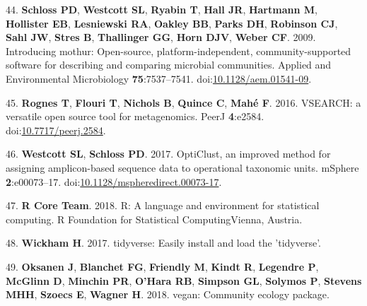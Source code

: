 \documentclass[11,]{article}
\begin{document}
44. \textbf{Schloss PD}, \textbf{Westcott SL}, \textbf{Ryabin T},
\textbf{Hall JR}, \textbf{Hartmann M}, \textbf{Hollister EB},
\textbf{Lesniewski RA}, \textbf{Oakley BB}, \textbf{Parks DH},
\textbf{Robinson CJ}, \textbf{Sahl JW}, \textbf{Stres B},
\textbf{Thallinger GG}, \textbf{Horn DJV}, \textbf{Weber CF}. 2009.
Introducing mothur: Open-source, platform-independent,
community-supported software for describing and comparing microbial
communities. Applied and Environmental Microbiology
\textbf{75}:7537--7541.
doi:\href{http://dx.doi.org/10.1128/aem.01541-09}{10.1128/aem.01541-09}.

45. \textbf{Rognes T}, \textbf{Flouri T}, \textbf{Nichols B},
\textbf{Quince C}, \textbf{Mah{é} F}. 2016. VSEARCH: a versatile open
source tool for metagenomics. PeerJ \textbf{4}:e2584.
doi:\href{http://dx.doi.org/10.7717/peerj.2584}{10.7717/peerj.2584}.

46. \textbf{Westcott SL}, \textbf{Schloss PD}. 2017. OptiClust, an
improved method for assigning amplicon-based sequence data to
operational taxonomic units. mSphere \textbf{2}:e00073--17.
doi:\href{http://dx.doi.org/10.1128/mspheredirect.00073-17}{10.1128/mspheredirect.00073-17}.

47. \textbf{R Core Team}. 2018. R: A language and environment for
statistical computing. R Foundation for Statistical ComputingVienna,
Austria.

48. \textbf{Wickham H}. 2017. tidyverse: Easily install and load the
'tidyverse'.

49. \textbf{Oksanen J}, \textbf{Blanchet FG}, \textbf{Friendly M},
\textbf{Kindt R}, \textbf{Legendre P}, \textbf{McGlinn D},
\textbf{Minchin PR}, \textbf{O'Hara RB}, \textbf{Simpson GL},
\textbf{Solymos P}, \textbf{Stevens MHH}, \textbf{Szoecs E},
\textbf{Wagner H}. 2018. vegan: Community ecology package.
\end{document}

